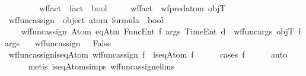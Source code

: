 \begin{isabellebody}
\ \ \ \ \isamarkupfalse%
%
\endisatagproof
{\isafoldproof}%
%
\isadelimproof
\isanewline
%
\endisadelimproof
\isanewline
\ \ \isamarkupfalse%
\ wf{\isacharunderscore}{\kern0pt}fact\ {\isacharcolon}{\kern0pt}{\isacharcolon}{\kern0pt}\ {\isachardoublequoteopen}fact\ {\isasymRightarrow}\ bool{\isachardoublequoteclose}\ \isanewline
\ \ \ \ {\isachardoublequoteopen}wf{\isacharunderscore}{\kern0pt}fact\ {\isacharequal}{\kern0pt}\ wf{\isacharunderscore}{\kern0pt}pred{\isacharunderscore}{\kern0pt}atom\ objT{\isachardoublequoteclose}\isanewline
\isanewline
\ \ \isamarkupfalse%
\ wf{\isacharunderscore}{\kern0pt}func{\isacharunderscore}{\kern0pt}assign\ {\isacharcolon}{\kern0pt}{\isacharcolon}{\kern0pt}\ {\isachardoublequoteopen}object\ atom\ formula\ {\isasymRightarrow}\ bool{\isachardoublequoteclose}\ \ \isanewline
\ \ \ \ {\isachardoublequoteopen}wf{\isacharunderscore}{\kern0pt}func{\isacharunderscore}{\kern0pt}assign\ {\isacharparenleft}{\kern0pt}Atom\ {\isacharparenleft}{\kern0pt}eqAtm\ {\isacharparenleft}{\kern0pt}FuncEnt\ f\ args{\isacharparenright}{\kern0pt}\ {\isacharparenleft}{\kern0pt}TimeEnt\ d{\isacharparenright}{\kern0pt}{\isacharparenright}{\kern0pt}{\isacharparenright}{\kern0pt}\ {\isasymlongleftrightarrow}\ wf{\isacharunderscore}{\kern0pt}func{\isacharunderscore}{\kern0pt}args\ objT\ {\isacharparenleft}{\kern0pt}f{\isacharcomma}{\kern0pt}args{\isacharparenright}{\kern0pt}{\isachardoublequoteclose}\isanewline
\ \ {\isacharbar}{\kern0pt}\ {\isachardoublequoteopen}wf{\isacharunderscore}{\kern0pt}func{\isacharunderscore}{\kern0pt}assign\ {\isacharunderscore}{\kern0pt}\ {\isasymlongleftrightarrow}\ False{\isachardoublequoteclose}\isanewline
\isanewline
\ \ \isamarkupfalse%
\ wf{\isacharunderscore}{\kern0pt}func{\isacharunderscore}{\kern0pt}assign{\isacharunderscore}{\kern0pt}is{\isacharunderscore}{\kern0pt}eqAtom{\isacharcolon}{\kern0pt}\ {\isachardoublequoteopen}wf{\isacharunderscore}{\kern0pt}func{\isacharunderscore}{\kern0pt}assign\ f\ {\isasymLongrightarrow}\ is{\isacharunderscore}{\kern0pt}eqAtom\ f{\isachardoublequoteclose}\isanewline
%
\isadelimproof
\ \ \ \ %
\endisadelimproof
%
\isatagproof
{}\isamarkupfalse%
\ {\isacharparenleft}{\kern0pt}cases\ f{\isacharparenright}{\kern0pt}\isanewline
\ \ \ \ \isamarkupfalse%
\ auto\isanewline
\ \ \ \ \isamarkupfalse%
\ {\isacharparenleft}{\kern0pt}metis\ is{\isacharunderscore}{\kern0pt}eqAtom{\isachardot}{\kern0pt}simps{\isacharparenleft}{\kern0pt}{}{\isacharparenright}{\kern0pt}\ wf{\isacharunderscore}{\kern0pt}func{\isacharunderscore}{\kern0pt}assign{\isachardot}{\kern0pt}elims{\isacharparenleft}{\kern0pt}{}{\isacharparenright}{\kern0pt}{\isacharparenright}{\kern0pt}\isanewline

\end{isabellebody}
